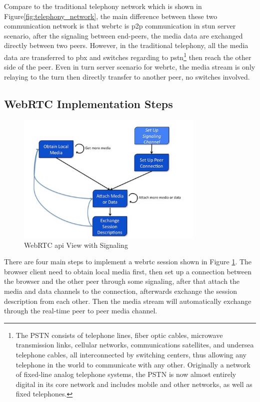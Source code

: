 \par Compare to the traditional telephony network which is shown in Figure\ref{fig:telephony_network}\cite{web:teleVSvoip}, the main difference between these two communication network is that \gls{webrtc} is \gls{p2p} communication in \gls{stun} server scenario, after the signaling between end-peers, the media data are exchanged directly between two peers. However, in the traditional telephony, all the media data are transferred to \gls{pbx} and switches regarding to \gls{pstn}\footnote{The PSTN consists of telephone lines, fiber optic cables, microwave transmission links, cellular networks, communications satellites, and undersea telephone cables, all interconnected by switching centers, thus allowing any telephone in the world to communicate with any other. Originally a network of fixed-line analog telephone systems, the PSTN is now almost entirely digital in its core network and includes mobile and other networks, as well as fixed telephones.\cite{wiki:pstn}} then reach the other side of the peer. Even in \gls{turn} server scenario for \gls{webrtc}, the media stream is only relaying to the \gls{turn} then directly transfer to another peer, no switches involved.

\subsection{WebRTC Implementation Steps}

\begin{figure}
	\centering
    	\includegraphics[width=0.80\textwidth,natwidth=610,natheight=642]{figs/webrtcApis.png}
  	\caption{WebRTC \gls{api} View with Signaling\cite{inbook:rtc-apis}}
  	\label{fig:webrtc_4steps}
\end{figure}

\noindent There are four main steps to implement a \gls{webrtc} session shown in Figure \ref{fig:webrtc_4steps}. The browser client need to obtain local media first, then set up a connection between the browser and the other peer through some signaling, after that attach the media and data channels to the connection, afterwards exchange the session description from each other. Then the media stream will automatically exchange through the real-time peer to peer media channel.

